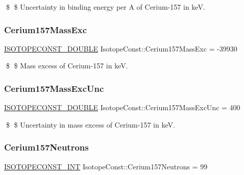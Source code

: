 \$ \$ Uncertainty in binding energy per A of Cerium-\/157 in keV. \mbox{\label{group___isotope_const-_cerium-_ce157_ga0e90e82a9b840629b8c089c55081b40e}} 
\subsubsection{\texorpdfstring{Cerium157\+Mass\+Exc}{Cerium157MassExc}}
{\footnotesize\ttfamily \mbox{\hyperlink{group___isotope_const-_macros_ga8f45a7272ce02c0b4c65c44636ed719a}{I\+S\+O\+T\+O\+P\+E\+C\+O\+N\+S\+T\+\_\+\+D\+O\+U\+B\+LE}} Isotope\+Const\+::\+Cerium157\+Mass\+Exc = -\/39930}

\$ \$ Mass excess of Cerium-\/157 in keV. \mbox{\label{group___isotope_const-_cerium-_ce157_ga4a1812fe28f4ea4f93444a3929ef323d}} 
\subsubsection{\texorpdfstring{Cerium157\+Mass\+Exc\+Unc}{Cerium157MassExcUnc}}
{\footnotesize\ttfamily \mbox{\hyperlink{group___isotope_const-_macros_ga8f45a7272ce02c0b4c65c44636ed719a}{I\+S\+O\+T\+O\+P\+E\+C\+O\+N\+S\+T\+\_\+\+D\+O\+U\+B\+LE}} Isotope\+Const\+::\+Cerium157\+Mass\+Exc\+Unc = 400}

\$ \$ Uncertainty in mass excess of Cerium-\/157 in keV. \mbox{\label{group___isotope_const-_cerium-_ce157_ga4bc7d676031b19620680aee7d50e1dea}} 
\subsubsection{\texorpdfstring{Cerium157\+Neutrons}{Cerium157Neutrons}}
{\footnotesize\ttfamily \mbox{\hyperlink{group___isotope_const-_macros_ga5f18360b3e99483a35c32d789e62621c}{I\+S\+O\+T\+O\+P\+E\+C\+O\+N\+S\+T\+\_\+\+I\+NT}} Isotope\+Const\+::\+Cerium157\+Neutrons = 99}

